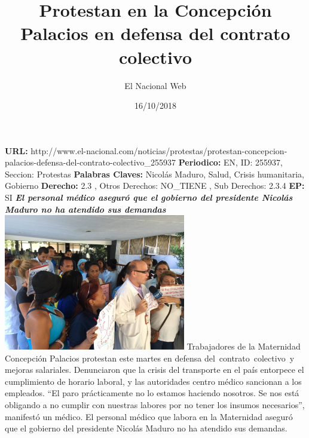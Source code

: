 \documentclass{article}%
\title{\textbf{Protestan en la Concepción Palacios en defensa del contrato colectivo}}%
\author{El Nacional Web}%
\date{16/10/2018}%
\begin{document}
%
\normalsize%
\maketitle%
\textbf{URL: }%
http://www.el{-}nacional.com/noticias/protestas/protestan{-}concepcion{-}palacios{-}defensa{-}del{-}contrato{-}colectivo\_255937\newline%
%
\textbf{Periodico: }%
EN, %
ID: %
255937, %
Seccion: %
Protestas\newline%
%
\textbf{Palabras Claves: }%
Nicolás Maduro, Salud, Crisis humanitaria, Gobierno\newline%
%
\textbf{Derecho: }%
2.3%
, Otros Derechos: %
NO\_TIENE%
, Sub Derechos: %
2.3.4%
\newline%
%
\textbf{EP: }%
SI\newline%
\newline%
%
\textbf{\textit{El personal médico aseguró que el gobierno del presidente Nicolás Maduro no ha atendido sus demandas}}%
\newline%
\newline%
%
\includegraphics[width=300px]{88.jpg}%
\newline%
%
Trabajadores de la Maternidad Concepción Palacios protestan este martes en defensa del~contrato~colectivo~y mejoras salariales.%
\newline%
%
Denunciaron que la crisis del transporte en el país entorpece el cumplimiento de horario laboral, y las autoridades centro médico sancionan a los empleados.%
\newline%
%
“El paro prácticamente no lo estamos haciendo nosotros. Se nos está obligando a no cumplir con nuestras labores por no tener los insumos necesarios”, manifestó un médico.%
\newline%
%
El personal médico que labora en la Maternidad aseguró que el gobierno del presidente Nicolás Maduro no ha atendido sus demandas.%
\newline%
%
\end{document}
